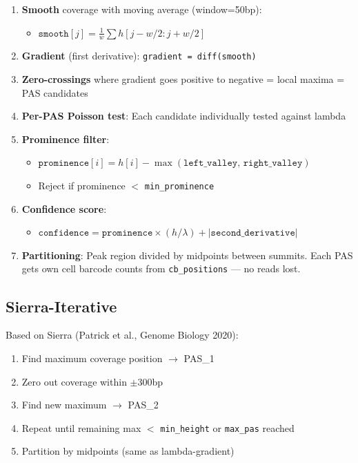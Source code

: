 \documentclass[11pt,a4paper]{article}
\begin{document}
\begin{enumerate}
  \item \textbf{Smooth} coverage with moving average (window=50bp):
        \begin{itemize}
          \item $\texttt{smooth}[j] = \frac{1}{w} \sum h[j-w/2 : j+w/2]$
        \end{itemize}
  \item \textbf{Gradient} (first derivative): \texttt{gradient = diff(smooth)}
  \item \textbf{Zero-crossings} where gradient goes positive to negative = local
        maxima = PAS candidates
  \item \textbf{Per-PAS Poisson test}: Each candidate individually tested against lambda
  \item \textbf{Prominence filter}:
        \begin{itemize}
          \item $\texttt{prominence}[i] = h[i] - \max(\texttt{left\_valley},\,\texttt{right\_valley})$
          \item Reject if prominence $<$ \texttt{min\_prominence}
        \end{itemize}
  \item \textbf{Confidence score}:
        \begin{itemize}
          \item $\texttt{confidence} = \texttt{prominence} \times (h / \lambda) + |\texttt{second\_derivative}|$
        \end{itemize}
  \item \textbf{Partitioning}: Peak region divided by midpoints between summits.
        Each PAS gets own cell barcode counts from \texttt{cb\_positions} --- no reads lost.
\end{enumerate}

\subsection{Sierra-Iterative}

Based on Sierra (Patrick et al., Genome Biology 2020):

\begin{enumerate}
  \item Find maximum coverage position $\to$ PAS\_1
  \item Zero out coverage within $\pm$300bp
  \item Find new maximum $\to$ PAS\_2
  \item Repeat until remaining max $<$ \texttt{min\_height} or \texttt{max\_pas} reached
  \item Partition by midpoints (same as lambda-gradient)
\end{enumerate}
\end{document}
